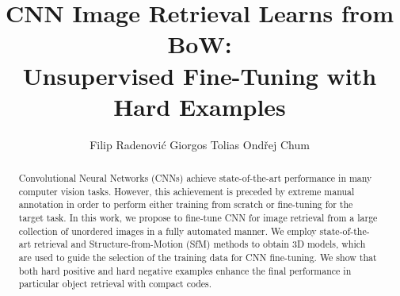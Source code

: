 \documentclass[runningheads]{llncs}
\begin{document}
\pagestyle{headings}
\mainmatter
\def\ECCV16SubNumber{825}  %


\title{CNN Image Retrieval Learns from BoW:\\ Unsupervised Fine-Tuning with Hard Examples}



\newcommand{\namespace}{\hspace{5mm}} \author{Filip Radenovi{\'c} \namespace Giorgos Tolias \namespace Ond{\v r}ej Chum} %


\maketitle



\begin{abstract}
%
Convolutional Neural Networks (CNNs) achieve state-of-the-art performance in many computer vision tasks. However, this achievement is preceded by extreme manual annotation in order to perform either training from scratch or fine-tuning for the target task. In this work, we propose to fine-tune CNN for image retrieval from a large collection of unordered images in a fully automated manner.
%
We employ state-of-the-art retrieval and Structure-from-Motion (SfM) methods to obtain 3D models, which are used to guide the selection of the training data for CNN fine-tuning. We show that both hard positive and hard negative examples enhance the final performance in particular object retrieval with compact codes.
%
\end{abstract}
\end{document}
